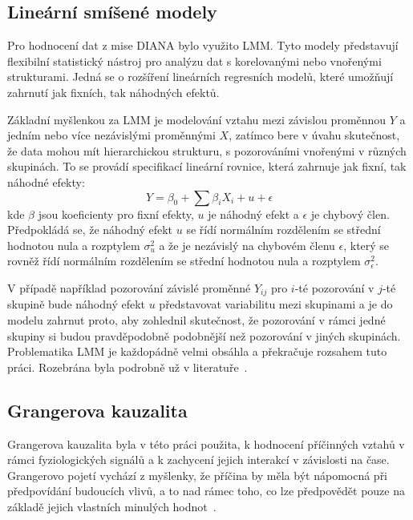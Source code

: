 \subsection{Lineární smíšené modely}
\label{subsec:lmm}
Pro hodnocení dat z mise DIANA bylo využito \gls{LMM}. Tyto modely představují
flexibilní statistický nástroj pro analýzu dat s korelovanými nebo vnořenými
strukturami. Jedná se o rozšíření lineárních regresních modelů, které umožňují
zahrnutí jak fixních, tak náhodných efektů.

Základní myšlenkou za LMM je modelování vztahu mezi závislou proměnnou $Y$ a
jedním nebo více nezávislými proměnnými $X$, zatímco bere v úvahu skutečnost, že
data mohou mít hierarchickou strukturu, s pozorováními vnořenými v různých
skupinách. To se provádí specifikací lineární rovnice, která zahrnuje jak fixní,
tak náhodné efekty:
\begin{equation}
    Y = \beta_0 + \sum \beta_i X_i + u + \epsilon
\end{equation}
kde $\beta$ jsou koeficienty pro fixní efekty, $u$ je náhodný efekt a $\epsilon$
je chybový člen. Předpokládá se, že náhodný efekt $u$ se řídí normálním
rozdělením se střední hodnotou nula a rozptylem $\sigma_u^2$ a že je nezávislý
na chybovém členu $\epsilon$, který se rovněž řídí normálním rozdělením se
střední hodnotou nula a rozptylem $\sigma_\epsilon^2$. 

V případě například pozorování závislé proměnné $Y_{ij}$ pro $i$-té pozorování v
$j$-té skupině bude náhodný efekt $u$ představovat variabilitu mezi skupinami a
je do modelu zahrnut proto, aby zohlednil skutečnost, že pozorování v rámci
jedné skupiny si budou pravděpodobně podobnější než pozorování v jiných
skupinách. Problematika \gls{LMM} je každopádně velmi obsáhla a překračuje
rozsahem tuto práci. Rozebrána byla podrobně už v literatuře~\cite{West2022}. 

\subsection{Grangerova kauzalita}
\label{subsec:granger}
Grangerova kauzalita byla v této práci použita, k hodnocení příčinných vztahů v
rámci fyziologických signálů a k zachycení jejich interakcí v závislosti na
čase. Grangerovo pojetí vychází z myšlenky, že příčina by měla být nápomocná při
předpovídání budoucích vlivů, a to nad rámec toho, co lze předpovědět pouze na
základě jejich vlastních minulých hodnot~\cite{Granger1969}.

